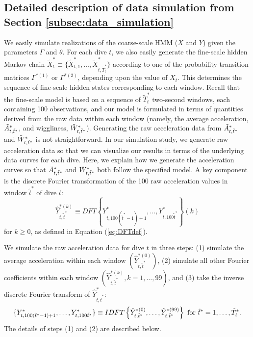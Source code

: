 \subsection{Detailed description of data simulation from Section \ref{subsec:data_simulation}}


\setcounter{equation}{4}   %


We easily simulate realizations of the coarse-scale HMM ($X$ and $Y$) given the parameters $\Gamma$ and $\theta$. For each dive $t$, we also easily generate the fine-scale hidden Markov chain $\tilde X^*_t \equiv \big\{\tilde X^*_{t,1},\ldots,\tilde X^*_{t,\tilde T_t^*}\big\}$ according to one of the probability transition matrices $\Gamma^{*(1)}$ or $\Gamma^{*(2)}$, depending upon the value of $X_t$. This determines the sequence of fine-scale hidden states corresponding to each window. Recall that the fine-scale model is based on a sequence of $\tilde T_t^*$ two-second windows, each containing 100 observations, and our model is formulated in terms of quantities derived from the raw data within each window (namely, the average acceleration, $\tilde{A}^*_{t,\tilde t^*}$, and wiggliness, $\tilde{W}^*_{ t,\tilde t^*}$). Generating the raw acceleration data from $\tilde{A}^*_{t,\tilde t^*}$ and $\tilde{W}^*_{ t,\tilde t^*}$ is not straightforward. In our simulation study, we generate raw acceleration data so that we can visualize our results in terms of the underlying data curves for each dive. Here, we explain how we generate the acceleration curves so that $\tilde{A}^*_{t,\tilde t^*}$ and $\tilde{W}^*_{ t,\tilde t^*}$ both follow the specified model. A key component is the discrete Fourier transformation of the 100 raw acceleration values in window $\tilde{t}^*$ of dive $t$:
\[
    \hat{Y}^{*(k)}_{t,\tilde{t}^*}  \equiv DFT\left\{Y^*_{t,100 (\tilde{t}^*-1) + 1 },\ldots, Y^*_{t,100 \tilde{t}^*}\right\}(k)
\]
for $k \geq 0$, as defined in Equation (\ref{eq:DFTdef}).

We simulate the raw acceleration data for dive $t$ in three steps: (1) simulate the average acceleration within each window $\left(\hat Y^{*(0)}_{t,\tilde t^*}\right)$, (2) simulate all other Fourier coefficients within each window $\left(\hat Y^{*(k)}_{t,\tilde t^*}, k = 1,\ldots,99\right)$, and (3) take the inverse discrete Fourier transform of $\hat{Y}^*_{t,\tilde t^*}$:
\[
    \{Y^*_{t,100(\tilde t^* - 1) + 1},\ldots,Y^*_{t,100\tilde t^*}\} \equiv IDFT\left\{\hat{Y}^{*(0)}_{t,\tilde t^*},
    \ldots, \hat{Y}^{*(99)}_{t,\tilde t^*}\right\}
    {\rm{~for~}} \tilde t^* = 1,\ldots,\tilde T^*_t.
\]
The details of steps (1) and (2) are described below.

